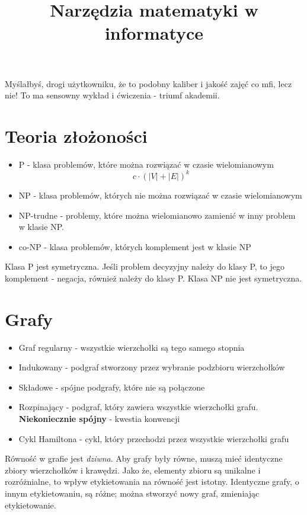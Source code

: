 \documentclass{../notatki}
\title{Narzędzia matematyki w informatyce}
\begin{document}
Myślałbyś, drogi użytkowniku, że to podobny kaliber i jakość zajęć co mfi, lecz
nie! To ma sensowny wykład i ćwiczenia - triumf akademii.

\section{Teoria złożoności}

\begin{itemize}
  \item P - klasa problemów, które można rozwiązać w czasie wielomianowym $$
    c \cdot (|V| + |E|)^k
    $$
  \item NP - klasa problemów, których nie można rozwiązać w czasie wielomianowym
  \item NP-trudne - problemy, które można wielomianowo zamienić w
    inny problem w klasie NP.
  \item co-NP - klasa problemów, których komplement jest w klasie NP
\end{itemize}

Klasa P jest symetryczna. Jeśli problem decyzyjny należy do klasy P, to jego
komplement - negacja, również należy do klasy P. Klasa NP nie jest symetryczna.

\section{Grafy}

\begin{itemize}
  \item Graf regularny - wszystkie wierzchołki są tego samego stopnia
  \item Indukowany - podgraf stworzony przez wybranie podzbioru wierzchołków
  \item Składowe - spójne podgrafy, które nie są połączone
  \item Rozpinający - podgraf, który zawiera wszystkie wierzchołki
    grafu. \textbf{Niekoniecznie spójny} - kwestia konwencji
  \item Cykl Hamiltona - cykl, który przechodzi przez wszystkie wierzchołki
    grafu
\end{itemize}

Równość w grafie jest \textit{dziwna}. Aby grafy były równe, muszą mieć
identyczne zbiory wierzchołków i krawędzi. Jako że, elementy zbioru są
unikalne i rozróżnialne, to wpływ etykietowania na równość jest istotny.
Identyczne grafy, o innym etykietowaniu, są różne; można stworzyć nowy graf,
zmieniając etykietowanie.
\end{document}

